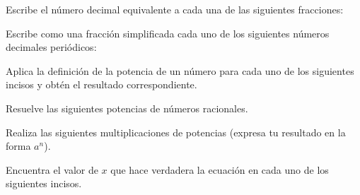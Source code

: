 \documentclass[11pt,addpoints]{exam}
\begin{document}

\begin{questions}

    Escribe el n\'umero decimal equivalente a cada una de las siguientes fracciones:
    \begin{multicols}{2}
        \begin{parts}
            
            
        \end{parts}
    \end{multicols}
    \newpage
    Escribe como una fracci\'on simplificada cada uno de los siguientes n\'umeros decimales peri\'odicos:
    \begin{multicols}{2}
        \begin{parts}
            
            
        \end{parts}
    \end{multicols}

    Aplica la definici\'on de la potencia de un n\'umero para cada uno de los siguientes incisos y obt\'en el resultado correspondiente.
    \begin{multicols}{2}
        \begin{parts}
            
            
        \end{parts}
    \end{multicols}

    Resuelve las siguientes potencias de n\'umeros racionales.
    \begin{multicols}{2}
        \begin{parts}
            
            
        \end{parts}
    \end{multicols}
    \newpage
    Realiza las siguientes multiplicaciones de potencias (expresa tu resultado en la forma $a^n$).
    \begin{multicols}{2}
        \begin{parts}
            
            
        \end{parts}
    \end{multicols}

    Encuentra el valor de $x$ que hace verdadera la ecuaci\'on en cada uno de los siguientes incisos.
    \begin{multicols}{2}
        \begin{parts}
            
            
        \end{parts}
    \end{multicols}


\end{questions}
\end{document}
